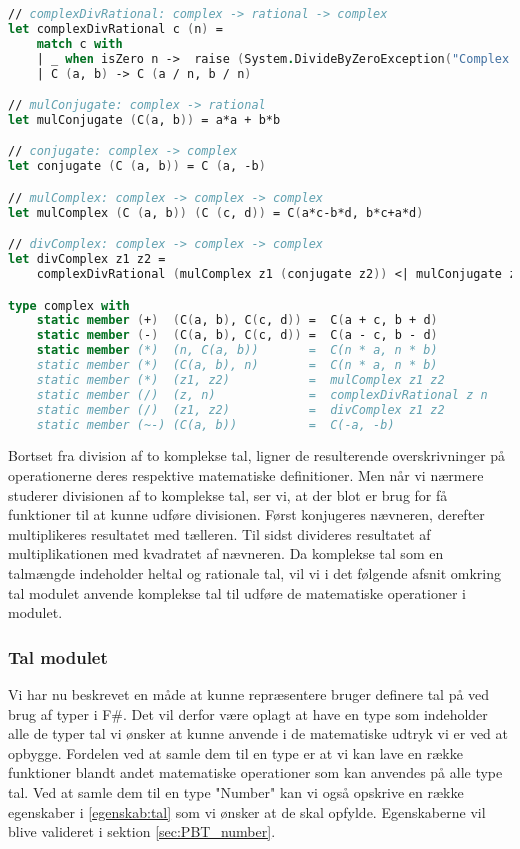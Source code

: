\begin{lstlisting}[language={FSharp}, 
    label={complex_operations},
    caption={Overskrivning af operationer på komplekse tal}]
// complexDivRational: complex -> rational -> complex
let complexDivRational c (n) = 
    match c with
    | _ when isZero n ->  raise (System.DivideByZeroException("Complex.divRational: Cannot divide by zero!"))
    | C (a, b) -> C (a / n, b / n) 

// mulConjugate: complex -> rational
let mulConjugate (C(a, b)) = a*a + b*b

// conjugate: complex -> complex
let conjugate (C (a, b)) = C (a, -b)

// mulComplex: complex -> complex -> complex
let mulComplex (C (a, b)) (C (c, d)) = C(a*c-b*d, b*c+a*d)

// divComplex: complex -> complex -> complex
let divComplex z1 z2 =
    complexDivRational (mulComplex z1 (conjugate z2)) <| mulConjugate z2

type complex with
    static member (+)  (C(a, b), C(c, d)) =  C(a + c, b + d)
    static member (-)  (C(a, b), C(c, d)) =  C(a - c, b - d)
    static member (*)  (n, C(a, b))       =  C(n * a, n * b)
    static member (*)  (C(a, b), n)       =  C(n * a, n * b)
    static member (*)  (z1, z2)           =  mulComplex z1 z2
    static member (/)  (z, n)             =  complexDivRational z n
    static member (/)  (z1, z2)           =  divComplex z1 z2 
    static member (~-) (C(a, b))          =  C(-a, -b)
\end{lstlisting}    

Bortset fra division af to komplekse tal, ligner de resulterende overskrivninger på operationerne deres respektive matematiske definitioner. Men når vi nærmere studerer divisionen af to komplekse tal, ser vi, at der blot er brug for få funktioner til at kunne udføre divisionen. Først konjugeres nævneren, derefter multiplikeres resultatet med tælleren. Til sidst divideres resultatet af multiplikationen med kvadratet af nævneren. Da komplekse tal som en talmængde indeholder heltal og rationale tal, vil vi i det følgende afsnit omkring tal modulet anvende komplekse tal til udføre de matematiske operationer i modulet.


\subsubsection{Tal modulet}
Vi har nu beskrevet en måde at kunne repræsentere bruger definere tal på ved brug af typer i F\#. Det vil derfor være oplagt at have en type som indeholder alle de typer tal vi ønsker at kunne anvende i de matematiske udtryk vi er ved at opbygge. Fordelen ved at samle dem til en type er at vi kan lave en række funktioner blandt andet matematiske operationer som kan anvendes på alle type tal. Ved at samle dem til en type "Number" kan vi også opskrive en række egenskaber i \ref{egenskab:tal} som vi ønsker at de skal opfylde. Egenskaberne vil blive valideret i sektion \ref{sec:PBT_number}.

